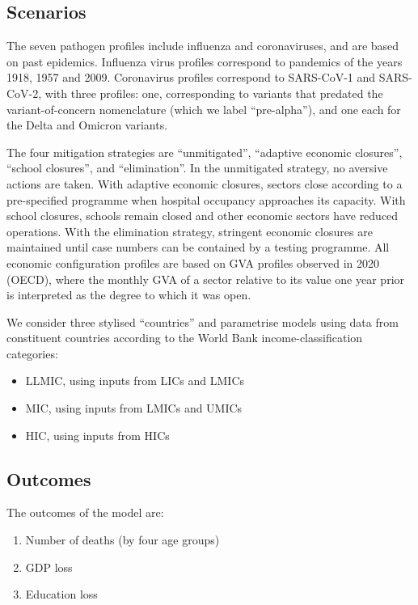 \documentclass[
]{article}
\providecommand{\tightlist}{%
  \setlength{\itemsep}{0pt}\setlength{\parskip}{0pt}}
\begin{document}
\hypertarget{scenarios}{%
\subsection{Scenarios}\label{scenarios}}

The seven pathogen profiles include influenza and coronaviruses, and are based on past epidemics. Influenza virus profiles correspond to pandemics of the years 1918, 1957 and 2009. Coronavirus profiles correspond to SARS-CoV-1 and SARS-CoV-2, with three profiles: one, corresponding to variants that predated the variant-of-concern nomenclature (which we label ``pre-alpha''), and one each for the Delta and Omicron variants.

The four mitigation strategies are ``unmitigated'', ``adaptive economic closures'', ``school closures'', and ``elimination''. In the unmitigated strategy, no aversive actions are taken. With adaptive economic closures, sectors close according to a pre-specified programme when hospital occupancy approaches its capacity. With school closures, schools remain closed and other economic sectors have reduced operations. With the elimination strategy, stringent economic closures are maintained until case numbers can be contained by a testing programme. All economic configuration profiles are based on GVA profiles observed in 2020 (OECD), where the monthly GVA of a sector relative to its value one year prior is interpreted as the degree to which it was open.

We consider three stylised ``countries'' and parametrise models using data from constituent countries according to the World Bank income-classification categories:

\begin{itemize}
\tightlist
\item
  LLMIC, using inputs from LICs and LMICs
\item
  MIC, using inputs from LMICs and UMICs
\item
  HIC, using inputs from HICs
\end{itemize}

\hypertarget{outcomes}{%
\subsection{Outcomes}\label{outcomes}}

The outcomes of the model are:

\begin{enumerate}
\def\labelenumi{\arabic{enumi}.}
\tightlist
\item
  Number of deaths (by four age groups)
\item
  GDP loss
\item
  Education loss
\end{enumerate}
\end{document}
